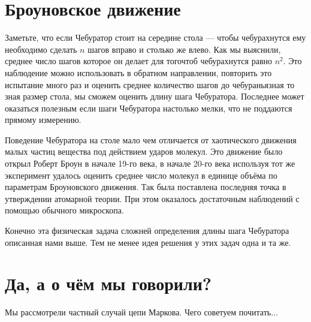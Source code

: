 \documentclass{article}
\begin{document}
\section{Броуновское движение}

Заметьте, что если Чебуратор стоит на середине стола ---
чтобы чебурахнутся ему необходимо сделать $n$ шагов вправо и столько же влево.
Как мы выяснили, 
среднее число шагов которое он делает для тогочтоб чебурахнутся 
равно $n^2$.
Это наблюдение можно использовать в обратном направлении,
повторить это испытание много раз и 
оценить среднее количество шагов до чебураньязная 
то зная размер стола, мы сможем оценить длину шага Чебуратора.
Последнее может оказаться полезным если шаги Чебуратора настолько мелки, что не поддаются прямому измерению. 

Поведение Чебуратора на столе мало чем отличается 
от хаотического движения малых частиц вещества под действием ударов молекул. 
Это движение было открыл Роберт Броун в начале 19-го века, 
в начале 20-го века используя тот же эксперимент удалось оценить среднее число молекул в единице объёма по параметрам Броуновского движения.
Так была поставлена последняя точка в утверждении атомарной теории.
При этом оказалось достаточным наблюдений с помощью обычного микроскопа.

Конечно эта физическая задача сложней определения длины шага Чебуратора описанная нами выше.
Тем не менее идея решения у этих задач одна и та же.

\section{Да, а о чём мы говорили?}

Мы рассмотрели частный случай цепи Маркова.
Чего советуем почитать...
\end{document}

